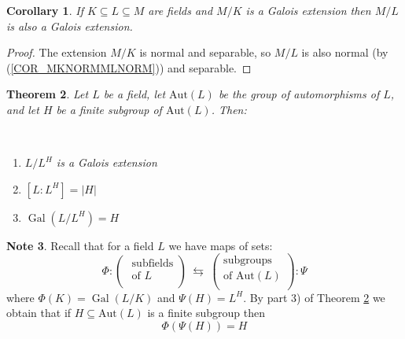 \documentclass[12pt, letterpaper, oneside]{article}
\theoremstyle{plain}
\newtheorem{theorem}{Theorem}[section]
\newtheorem{corollary}[theorem]{Corollary}
\theoremstyle{definition}
\newtheorem{note}[theorem]{Note}
\newcommand{\Aut}{\mathrm{Aut}}
\newcommand{\Gal}{\operatorname{Gal}}
\newcommand{\benu}{\begin{enumerate}}
\newcommand{\eenu}{\end{enumerate}}
\newcommand{\vs}{\vskip 5mm}
\begin{document}
\vs\vs

\begin{corollary}
\label{COR_MKGALMLGAL}
If $K\subseteq L \subseteq M$ are fields and $M/K$ is a Galois extension then 
$M/L$ is also a Galois extension. 
\end{corollary}


\vs 

\begin{proof}
The extension $M/K$ is  normal and separable, so $M/L$ is also normal 
(by (\ref{COR_MKNORMMLNORM})) and separable.  
\end{proof}



\vs\vs


\begin{theorem}
\label{THM_GALOISEXTPROPS}
Let $L$ be a field, let $\Aut(L)$ be the group of automorphisms of $L$, and let 
$H$ be a finite subgroup of $\Aut(L)$.  Then:

\vskip -13mm

\ 
\benu
\item $L/L^{H}$ is a Galois extension
\item $[L:L^{H}] = |H|$
\item $\Gal(L/L^{H}) = H$
\eenu


\end{theorem}


\vs\vs\vs\vs

\begin{note}
Recall that for a field $L$ we have maps of sets:
$$
\Phi\colon 
\begin{pmatrix}
\text{ subfields} \\[1mm]
\text{ of  $L$} \\
\end{pmatrix}
\ \leftrightarrows \ 
\begin{pmatrix}
\text{subgroups} \\[1mm]
\text{of $\Aut(L)$} \\
\end{pmatrix}
\colon \Psi
$$
where $\Phi(K) = \Gal(L/K)$ and $\Psi(H) = L^{H}$.  By part 3) of Theorem 
\ref{THM_GALOISEXTPROPS} we obtain that if $H\subseteq \Aut(L)$ is a finite
subgroup then 
$$\Phi(\Psi(H)) = H$$ 
\end{note}


\vs\vs
\end{document}
